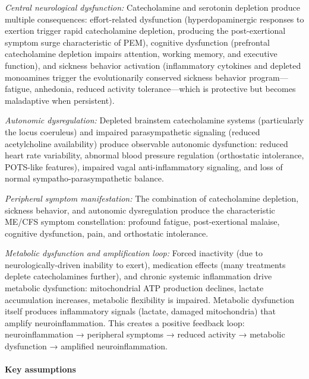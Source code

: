 \begin{hypothesis}
\textit{Central neurological dysfunction:} Catecholamine and serotonin depletion produce multiple consequences: effort-related dysfunction (hyperdopaminergic responses to exertion trigger rapid catecholamine depletion, producing the post-exertional symptom surge characteristic of PEM), cognitive dysfunction (prefrontal catecholamine depletion impairs attention, working memory, and executive function), and sickness behavior activation (inflammatory cytokines and depleted monoamines trigger the evolutionarily conserved sickness behavior program---fatigue, anhedonia, reduced activity tolerance—which is protective but becomes maladaptive when persistent).

\textit{Autonomic dysregulation:} Depleted brainstem catecholamine systems (particularly the locus coeruleus) and impaired parasympathetic signaling (reduced acetylcholine availability) produce observable autonomic dysfunction: reduced heart rate variability, abnormal blood pressure regulation (orthostatic intolerance, POTS-like features), impaired vagal anti-inflammatory signaling, and loss of normal sympatho-parasympathetic balance.

\textit{Peripheral symptom manifestation:} The combination of catecholamine depletion, sickness behavior, and autonomic dysregulation produce the characteristic ME/CFS symptom constellation: profound fatigue, post-exertional malaise, cognitive dysfunction, pain, and orthostatic intolerance.

\textit{Metabolic dysfunction and amplification loop:} Forced inactivity (due to neurologically-driven inability to exert), medication effects (many treatments deplete catecholamines further), and chronic systemic inflammation drive metabolic dysfunction: mitochondrial ATP production declines, lactate accumulation increases, metabolic flexibility is impaired. Metabolic dysfunction itself produces inflammatory signals (lactate, damaged mitochondria) that amplify neuroinflammation. This creates a positive feedback loop: neuroinflammation → peripheral symptoms → reduced activity → metabolic dysfunction → amplified neuroinflammation.

\paragraph{Key assumptions}


\end{hypothesis}
